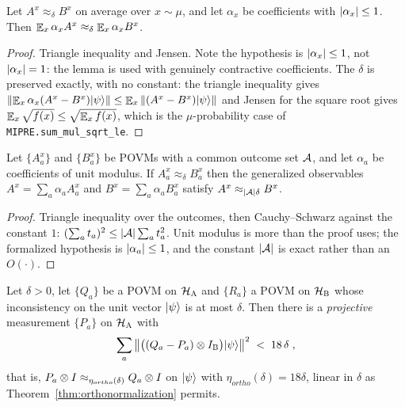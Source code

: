 \effortEasy

\begin{lemma}
\label{lem:qld-averaging}
\leanok
Let $A^x \approx_\delta B^x$ on average over $x \sim \mu$, and let $\alpha_x$ be coefficients
with $\left\vert {\alpha_x} \right\vert \leq 1$. Then $\mathop{\mathbb{E}}_x \alpha_x A^x \approx_\delta \mathop{\mathbb{E}}_x \alpha_x B^x$.
\end{lemma}

\begin{proof}
\leanok
Triangle inequality and Jensen. Note the hypothesis is $\left\vert {\alpha_x} \right\vert \leq 1$, not
$\left\vert {\alpha_x} \right\vert = 1$: the lemma is used with genuinely contractive coefficients. The
$\delta$ is preserved exactly, with no constant: the triangle inequality gives
$\left\| {\mathop{\mathbb{E}}_x \alpha_x (A^x - B^x)|\psi\rangle} \right\| \leq \mathop{\mathbb{E}}_x \left\| {(A^x - B^x)|\psi\rangle} \right\|$ and Jensen
for the square root gives $\mathop{\mathbb{E}}_x \sqrt{f(x)} \leq \sqrt{\mathop{\mathbb{E}}_x f(x)}$, which is the
$\mu$-probability case of \texttt{MIPRE.sum\_mul\_sqrt\_le}.
\end{proof}

\effortEasy

\begin{lemma}
\label{lem:qld-povm-to-obs}
\leanok
Let $\{A^x_a\}$ and $\{B^x_a\}$ be POVMs with a common outcome set $\mathcal{A}$, and let $\alpha_a$
be coefficients of unit modulus. If $A^x_a \approx_\delta B^x_a$ then the generalized
observables $A^x = \sum_a \alpha_a A^x_a$ and $B^x = \sum_a \alpha_a B^x_a$ satisfy
$A^x \approx_{\left\vert {\ensuremath{\mathcal{A}}} \right\vert \delta} B^x$.
\end{lemma}

\begin{proof}
\leanok
Triangle inequality over the outcomes, then Cauchy--Schwarz against the constant $1$:
$(\sum_a t_a)^2 \leq \left\vert {\ensuremath{\mathcal{A}}} \right\vert \sum_a t_a^2$. Unit modulus is more than the proof uses; the
formalized hypothesis is $\left\vert {\alpha_a} \right\vert \leq 1$, and the constant $\left\vert {\ensuremath{\mathcal{A}}} \right\vert$ is exact rather
than an $O(\cdot)$.
\end{proof}

\effortMedium

\begin{corollary}
\label{cor:ortho-from-consistency}
Let $\delta > 0$, let $\{Q_a\}$ be a POVM on $\mathcal{H}_{\textsc{A}}$ and $\{R_a\}$ a POVM on $\mathcal{H}_{\textsc{B}}$
whose inconsistency on the unit vector $|\psi\rangle$ is at most $\delta$. Then there is a
\emph{projective} measurement $\{P_a\}$ on $\mathcal{H}_{\textsc{A}}$ with
\begin{equation*}
  \sum_a \left\| {\bigl((Q_a - P_a) \otimes I_{\textsc{B}}\bigr)|\psi\rangle} \right\|^2 \;<\; 18\,\delta\;,
\end{equation*}
that is, $P_a \otimes I \approx_{\eta_{ortho}(\delta)} Q_a \otimes I$ on $|\psi\rangle$ with
$\eta_{ortho}(\delta) = 18\delta$, linear in $\delta$ as
Theorem~\ref{thm:orthonormalization} permits.
\end{corollary}

